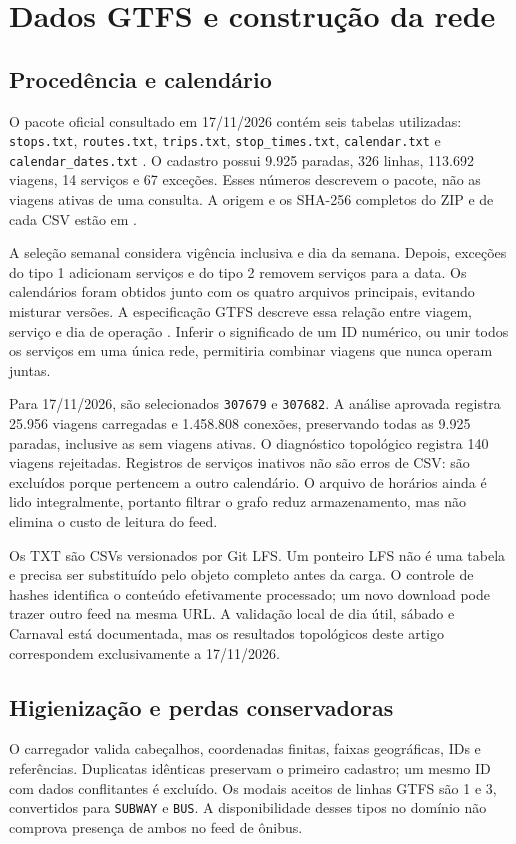 \documentclass[12pt]{article}
\newcommand{\code}[1]{\texttt{#1}}
\begin{document}
\section{Dados GTFS e construção da rede}
\subsection{Procedência e calendário}
O pacote oficial consultado em 17/11/2026 contém seis tabelas utilizadas: \code{stops.txt}, \code{routes.txt}, \code{trips.txt}, \code{stop\_times.txt}, \code{calendar.txt} e \code{calendar\_dates.txt} \cite{pbh}. O cadastro possui 9.925 paradas, 326 linhas, 113.692 viagens, 14 serviços e 67 exceções. Esses números descrevem o pacote, não as viagens ativas de uma consulta. A origem e os SHA-256 completos do ZIP e de cada CSV estão em .

A seleção semanal considera vigência inclusiva e dia da semana. Depois, exceções do tipo 1 adicionam serviços e do tipo 2 removem serviços para a data. Os calendários foram obtidos junto com os quatro arquivos principais, evitando misturar versões. A especificação GTFS descreve essa relação entre viagem, serviço e dia de operação \cite{gtfs}. Inferir o significado de um ID numérico, ou unir todos os serviços em uma única rede, permitiria combinar viagens que nunca operam juntas.

Para 17/11/2026, são selecionados \code{307679} e \code{307682}. A análise aprovada registra 25.956 viagens carregadas e 1.458.808 conexões, preservando todas as 9.925 paradas, inclusive as sem viagens ativas. O diagnóstico topológico registra 140 viagens rejeitadas. Registros de serviços inativos não são erros de CSV: são excluídos porque pertencem a outro calendário. O arquivo de horários ainda é lido integralmente, portanto filtrar o grafo reduz armazenamento, mas não elimina o custo de leitura do feed.

Os TXT são CSVs versionados por Git LFS. Um ponteiro LFS não é uma tabela e precisa ser substituído pelo objeto completo antes da carga. O controle de hashes identifica o conteúdo efetivamente processado; um novo download pode trazer outro feed na mesma URL. A validação local de dia útil, sábado e Carnaval está documentada, mas os resultados topológicos deste artigo correspondem exclusivamente a 17/11/2026.

\subsection{Higienização e perdas conservadoras}
O carregador valida cabeçalhos, coordenadas finitas, faixas geográficas, IDs e referências. Duplicatas idênticas preservam o primeiro cadastro; um mesmo ID com dados conflitantes é excluído. Os modais aceitos de linhas GTFS são 1 e 3, convertidos para \code{SUBWAY} e \code{BUS}. A disponibilidade desses tipos no domínio não comprova presença de ambos no feed de ônibus.
\end{document}
